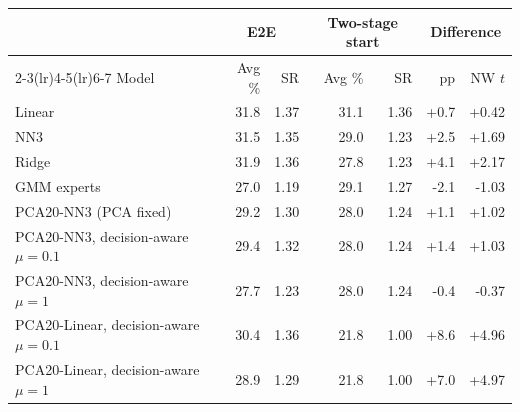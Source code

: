 \begin{tabular}{lrrrrrr}
\toprule
 & \multicolumn{2}{c}{E2E} & \multicolumn{2}{c}{Two-stage start} & \multicolumn{2}{c}{Difference} \\
\cmidrule(lr){2-3}\cmidrule(lr){4-5}\cmidrule(lr){6-7}
Model & Avg \% & SR & Avg \% & SR & pp & NW $t$ \\
\midrule
Linear & 31.8 & 1.37 & 31.1 & 1.36 & +0.7 & +0.42 \\
NN3 & 31.5 & 1.35 & 29.0 & 1.23 & +2.5 & +1.69 \\
Ridge & 31.9 & 1.36 & 27.8 & 1.23 & +4.1 & +2.17 \\
GMM experts & 27.0 & 1.19 & 29.1 & 1.27 & -2.1 & -1.03 \\
PCA20-NN3 (PCA fixed) & 29.2 & 1.30 & 28.0 & 1.24 & +1.1 & +1.02 \\
PCA20-NN3, decision-aware $\mu=0.1$ & 29.4 & 1.32 & 28.0 & 1.24 & +1.4 & +1.03 \\
PCA20-NN3, decision-aware $\mu=1$ & 27.7 & 1.23 & 28.0 & 1.24 & -0.4 & -0.37 \\
PCA20-Linear, decision-aware $\mu=0.1$ & 30.4 & 1.36 & 21.8 & 1.00 & +8.6 & +4.96 \\
PCA20-Linear, decision-aware $\mu=1$ & 28.9 & 1.29 & 21.8 & 1.00 & +7.0 & +4.97 \\
\bottomrule
\end{tabular}
